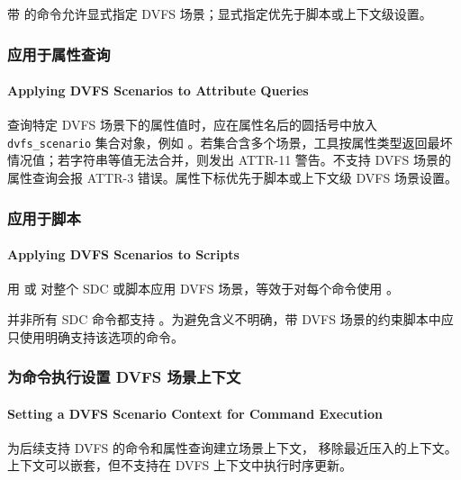 带  的命令允许显式指定 DVFS 场景；显式指定优先于脚本或上下文级设置。

\subsubsection{应用于属性查询}
\paragraph*{Applying DVFS Scenarios to Attribute Queries}

查询特定 DVFS 场景下的属性值时，应在属性名后的圆括号中放入 \texttt{dvfs\_scenario} 集合对象，例如 。若集合含多个场景，工具按属性类型返回最坏情况值；若字符串等值无法合并，则发出 ATTR-11 警告。不支持 DVFS 场景的属性查询会报 ATTR-3 错误。属性下标优先于脚本或上下文级 DVFS 场景设置。

\subsubsection{应用于脚本}
\paragraph*{Applying DVFS Scenarios to Scripts}

用  或  对整个 SDC 或脚本应用 DVFS 场景，等效于对每个命令使用 。

\begin{noteBox}
并非所有 SDC 命令都支持 。为避免含义不明确，带 DVFS 场景的约束脚本中应只使用明确支持该选项的命令。
\end{noteBox}

\subsubsection{为命令执行设置 DVFS 场景上下文}
\paragraph*{Setting a DVFS Scenario Context for Command Execution}

 为后续支持 DVFS 的命令和属性查询建立场景上下文， 移除最近压入的上下文。上下文可以嵌套，但不支持在 DVFS 上下文中执行时序更新。


